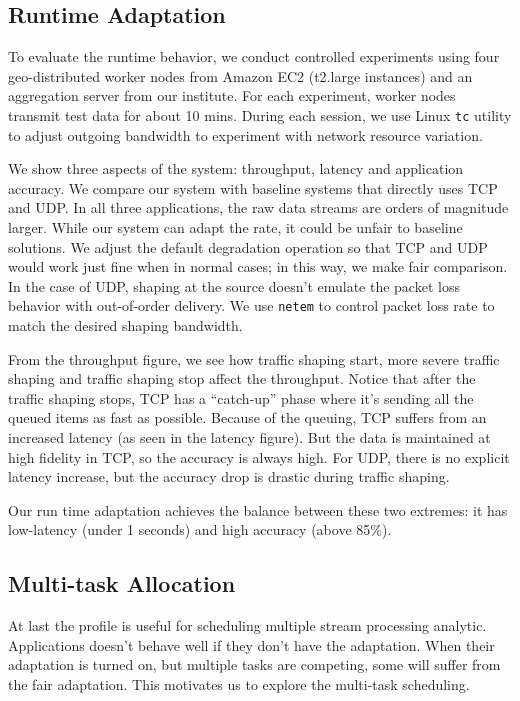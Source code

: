 \subsection{Runtime Adaptation}
\label{sec:runtime-adaptation}

To evaluate the runtime behavior, we conduct controlled experiments using four
geo-distributed worker nodes from Amazon EC2 (t2.large instances) and an
aggregation server from our institute. For each experiment, worker nodes
transmit test data for about 10 mins. During each session, we use Linux
\texttt{tc} utility to adjust outgoing bandwidth to experiment with network
resource variation.

We show three aspects of the system: throughput, latency and application
accuracy. We compare our system with baseline systems that directly uses TCP and
UDP. In all three applications, the raw data streams are orders of magnitude
larger. While our system can adapt the rate, it could be unfair to baseline
solutions. We adjust the default degradation operation so that TCP and UDP would
work just fine when in normal cases; in this way, we make fair comparison. In
the case of UDP, shaping at the source doesn't emulate the packet loss behavior
with out-of-order delivery. We use \texttt{netem} to control packet loss rate to
match the desired shaping bandwidth.

From the throughput figure, we see how traffic shaping start, more severe
traffic shaping and traffic shaping stop affect the throughput. Notice that
after the traffic shaping stops, TCP has a ``catch-up'' phase where it's sending
all the queued items as fast as possible. Because of the queuing, TCP suffers
from an increased latency (as seen in the latency figure). But the data is
maintained at high fidelity in TCP, so the accuracy is always high. For UDP,
there is no explicit latency increase, but the accuracy drop is drastic during
traffic shaping.

Our run time adaptation achieves the balance between these two extremes: it has
low-latency (under 1 seconds) and high accuracy (above 85\%).

\lipsum[1-2]

\newpage

\subsection{Multi-task Allocation}
\label{sec:multi-task-alloc}

At last the profile is useful for scheduling multiple stream processing
analytic. Applications doesn't behave well if they don't have the
adaptation. When their adaptation is turned on, but multiple tasks are
competing, some will suffer from the fair adaptation. This motivates us to
explore the multi-task scheduling.

